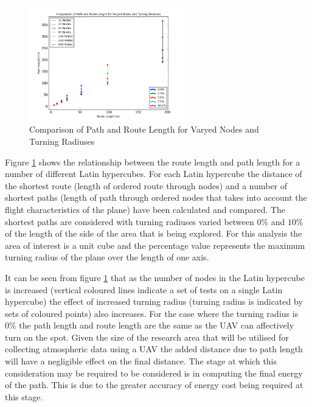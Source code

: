 \documentclass[a4paper,12pt,twoside]{article}
\begin{document}
\begin{figure}
\centering
\includegraphics[width=0.6\textwidth]{figures/comparison_of_path_and_route_length_for_varyed_nodes_and_turning_radiuses.png} 
\caption{Comparison of Path and Route Length for Varyed Nodes and Turning Radiuses}
\label{fig:comparison_of_path_and_route_length_for_varyed_nodes_and_turning_radiuses}
\end{figure}

Figure \ref{fig:comparison_of_path_and_route_length_for_varyed_nodes_and_turning_radiuses} shows the relationship between the route length and path length for a number of different Latin hypercubes. For each Latin hypercube the distance of the shortest route (length of ordered route through nodes) and a number of shortest paths (length of path through ordered nodes that takes into account the flight characteristics of the plane) have been calculated and compared. The shortest paths are considered with turning radiuses varied between $0\%$ and $10\%$ of the length of the side of the area that is being explored. For this analysis the area of interest is a unit cube and the percentage value represents the maximum turning radius of the plane over the length of one axis.

It can be seen from figure \ref{fig:comparison_of_path_and_route_length_for_varyed_nodes_and_turning_radiuses} that as the number of nodes in the Latin hypercube is increased (vertical coloured lines indicate a set of tests on a single Latin hypercube) the effect of increased turning radius (turning radius is indicated by sets of coloured points) also increases. For the case where the turning radius is $0\%$ the path length and route length are the same as the UAV can affectively turn on the spot. Given the size of the research area that will be utilised for collecting atmospheric data using a UAV the added distance due to path length will have a negligible effect on the final distance. The stage at which this consideration may be required to be considered is in computing the final energy of the path. This is due to the greater accuracy of energy cost being required at this stage.
\end{document}
